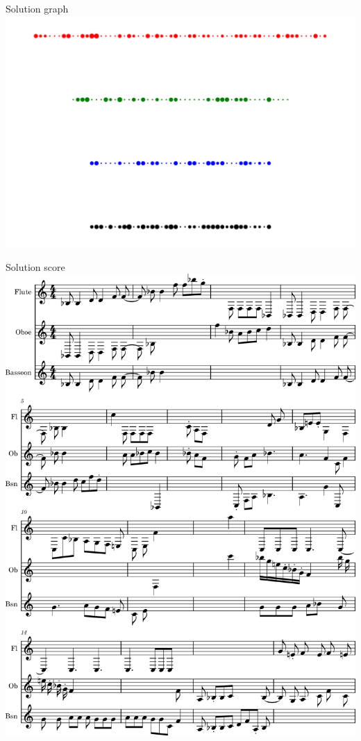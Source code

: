 \documentclass{beamer}
\begin{document}
\begin{frame}{Solution graph}
    \includegraphics[width=\textwidth]{sample-graph.pdf}
\end{frame}

\begin{frame}{Solution score}
    \centering
    \includegraphics[width=.5\textwidth]{solution-score.png}
\end{frame}
\end{document}
